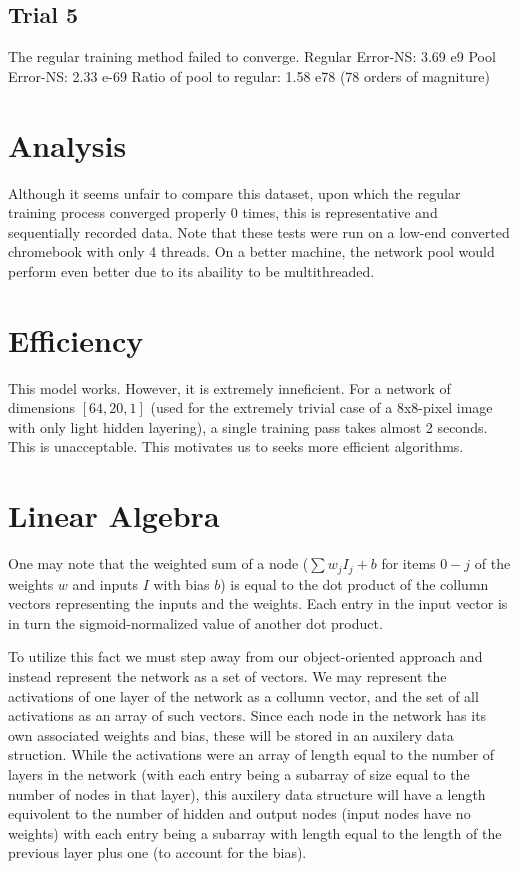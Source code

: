 \documentclass[8pt]{amsart}
\begin{document}
\subsection{Trial 5}

The regular training method failed to converge.
Regular Error-NS: 3.69 e9
Pool Error-NS: 2.33 e-69
Ratio of pool to regular: 1.58 e78 (78 orders of magniture)

\section{Analysis}

Although it seems unfair to compare this dataset, upon which the regular
training process converged properly 0 times, this is representative and
sequentially recorded data. Note that these tests were run on a low-end
converted chromebook with only 4 threads. On a better machine, the
network pool would perform even better due to its abaility to be multithreaded.

\section{Efficiency}

This model works. However, it is extremely inneficient. For a network
of dimensions $[64, 20, 1]$ (used for the extremely trivial case of a
8x8-pixel image with only light hidden layering), a single training pass
takes almost 2 seconds. This is unacceptable. This motivates us to seeks more
efficient algorithms.

\section{Linear Algebra}

One may note that the weighted sum of a node ($\sum{w_j I_j} + b$ for items $0-j$
of the weights $w$ and inputs $I$ with bias $b$) is equal to the dot product
of the collumn vectors representing the inputs and the weights. Each entry in
the input vector is in turn the sigmoid-normalized value of another dot product.

To utilize this fact we must step away from our object-oriented approach and
instead represent the network as a set of vectors. We may represent the activations
of one layer of the network as a collumn vector, and the set of all activations as
an array of such vectors. Since each node in the network has its own associated
weights and bias, these will be stored in an auxilery data struction. While the
activations were an array of length equal to the number of layers in the network
(with each entry being a subarray of size equal to the number of nodes in that
layer), this auxilery data structure will have a length equivolent to the number
of hidden and output nodes (input nodes have no weights) with each entry being a
subarray with length equal to the length of the previous layer plus one (to
account for the bias).
\end{document}
